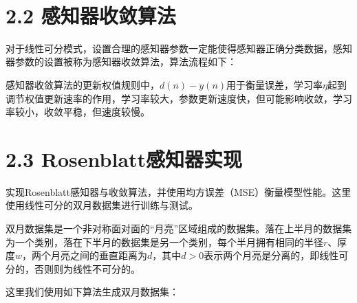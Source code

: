 \documentclass[11pt]{article}
\begin{document}
    \begin{center}
    \end{center}
    { \hspace*{\fill} \\}
    
    \section{2.2
感知器收敛算法}\label{ux611fux77e5ux5668ux6536ux655bux7b97ux6cd5}

对于线性可分模式，设置合理的感知器参数一定能使得感知器正确分类数据，感知器参数的设置被称为感知器收敛算法，算法流程如下：

    感知器收敛算法的更新权值规则中，\(d(n)-y(n)\)用于衡量误差，学习率\(\eta\)起到调节权值更新速率的作用，学习率较大，参数更新速度快，但可能影响收敛，学习率较小，收敛平稳，但速度较慢。

    \section{2.3
Rosenblatt感知器实现}\label{rosenblattux611fux77e5ux5668ux5b9eux73b0}

实现Rosenblatt感知器与收敛算法，并使用均方误差（MSE）衡量模型性能。这里使用线性可分的双月数据集进行训练与测试。

    双月数据集是一个非对称面对面的``月亮''区域组成的数据集。落在上半月的数据集为一个类别，落在下半月的数据集是另一个类别，每个半月拥有相同的半径\(r\)、厚度\(w\)，两个月亮之间的垂直距离为\(d\)，其中\(d>0\)表示两个月亮是分离的，即线性可分的，否则则为线性不可分的。

    这里我们使用如下算法生成双月数据集：
\end{document}
